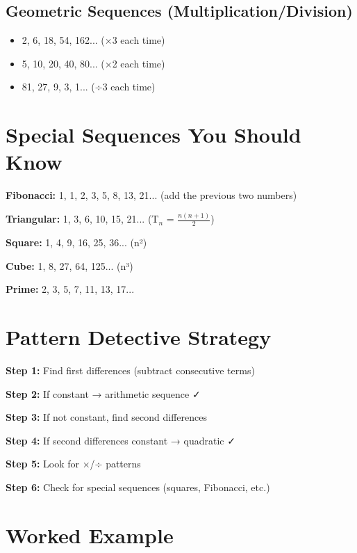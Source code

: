 \documentclass[a4paper,11pt]{article}
\begin{document}
\subsection{Geometric Sequences (Multiplication/Division)}
\begin{itemize}
    \item 2, 6, 18, 54, 162... (×3 each time)
    \item 5, 10, 20, 40, 80... (×2 each time)
    \item 81, 27, 9, 3, 1... (÷3 each time)
\end{itemize}

\section{Special Sequences You Should Know}

\begin{tcolorbox}[colback=red!5!white,colframe=red!75!black,title=\textbf{Famous Sequences}]
\textbf{Fibonacci:} 1, 1, 2, 3, 5, 8, 13, 21... (add the previous two numbers)

\textbf{Triangular:} 1, 3, 6, 10, 15, 21... (T$_n$ = $\frac{n(n+1)}{2}$)

\textbf{Square:} 1, 4, 9, 16, 25, 36... (n²)

\textbf{Cube:} 1, 8, 27, 64, 125... (n³)

\textbf{Prime:} 2, 3, 5, 7, 11, 13, 17...
\end{tcolorbox}

\section{Pattern Detective Strategy}

\begin{tcolorbox}[colback=purple!5!white,colframe=purple!75!black,title=\textbf{How to Solve Any Sequence}]
\textbf{Step 1:} Find first differences (subtract consecutive terms)

\textbf{Step 2:} If constant → arithmetic sequence ✓

\textbf{Step 3:} If not constant, find second differences  

\textbf{Step 4:} If second differences constant → quadratic ✓

\textbf{Step 5:} Look for ×/÷ patterns

\textbf{Step 6:} Check for special sequences (squares, Fibonacci, etc.)
\end{tcolorbox}

\section{Worked Example}
\end{document}

